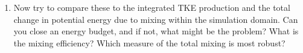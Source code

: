 \documentclass[11pt]{article}
\begin{document}
\begin{enumerate}
\begin{enumerate}
			
			\item  Now try to compare these to the integrated TKE production and the total change in potential energy due to mixing within the simulation domain. Can you close an energy budget, and if not, what might be the problem? What is the mixing efficiency? Which measure of the total mixing is most robust?
		
		\end{enumerate}
		
	\end{enumerate}
		
	
	
	
	
	
	
	
	
	
\end{document}
